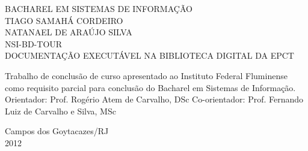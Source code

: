 \begin{titlepage}
 \begin{figure}[ht]
 \centering
 \end{figure}
 \begin{center}
   {\large BACHAREL EM SISTEMAS DE INFORMAÇÃO} \\ [3.5cm]
   {\large TIAGO SAMAHÁ CORDEIRO} \\
   {\large NATANAEL DE ARAÚJO SILVA} \\ [4cm]
   {\large NSI-BD-TOUR}\\ [0.5cm]
   {\small DOCUMENTAÇÃO EXECUTÁVEL NA BIBLIOTECA DIGITAL DA EPCT} \\ [2.5cm]
   \hspace{.45\textwidth} %
   \begin{minipage}{0.53\textwidth}
   \begin{espacosimples}
      Trabalho de conclusão de curso apresentado ao Instituto Federal Fluminense como requisito parcial para conclusão do Bacharel em Sistemas de Informação.\\[1.5cm]
      Orientador: Prof. Rogério Atem de Carvalho, DSc
      Co-orientador: Prof. Fernando Luiz de Carvalho e Silva, MSc
    \end{espacosimples}
    \end{minipage}
   \vfill
   {\large Campos dos Goytacazes/RJ} \\
   {\large 2012}
 \end{center}
\end{titlepage}
